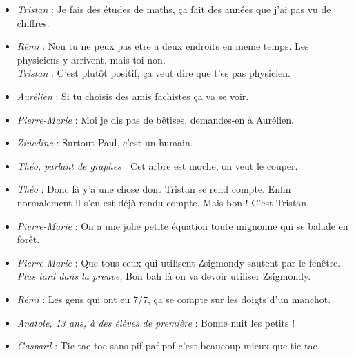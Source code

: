 \setlength{\parindent}{0cm}



\begin{itemize}

\item \textit{Tristan} : \og Je fais des études de maths, ça fait des années que j'ai pas vu de chiffres. \fg

\item \textit{Rémi} : \og Non tu ne peux pas etre a deux endroits en meme temps. Les physiciens y arrivent, mais toi non. \fg \\
\textit{Tristan} : \og C'est plutôt positif, ça veut dire que t'es pas physicien. \fg

\item \textit{Aurélien} : \og Si tu choisis des amis fachistes ça va se voir. \fg

\item \textit{Pierre-Marie} : \og Moi je dis pas de bêtises, demandes-en à Aurélien. \fg

\item \textit{Zinedine} : \og Surtout Paul, c'est un humain. \fg
\item \textit{Théo, parlant de graphes} : \og Cet arbre est moche, on veut le couper. \fg

\item \textit{Théo} : \og Donc là y'a une chose dont Tristan se rend compte. Enfin normalement il s'en est déjà rendu compte. Mais bon ! C'est Tristan. \fg

\item \textit{Pierre-Marie} : \og On a une jolie petite équation toute mignonne qui se balade en forêt. \fg

\item \textit{Pierre-Marie} : \og Que tous ceux qui utilisent Zsigmondy sautent par le fenêtre. \fg \\
\textit{Plus tard dans la preuve,} Bon bah là on va devoir utiliser Zsigmondy.

\item \textit{Rémi} : \og Les gens qui ont eu 7/7, ça se compte sur les doigts d'un manchot. \fg

\item \textit{Anatole, 13 ans, à des élèves de première} : \og Bonne nuit les petits ! \fg

\item \textit{Gaspard} : \og Tic tac toc sans pif paf pof c'est beaucoup mieux que tic tac. \fg


\end{itemize}
